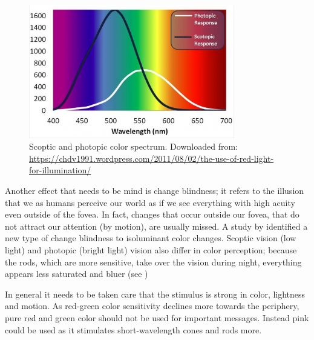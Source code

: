\begin{figure}
    \includegraphics[width=0.8\textwidth]{fig/scoptic.jpg}
    \caption[Color spectrum]{Scoptic and photopic color spectrum. Downloaded from: \url{https://chdv1991.wordpress.com/2011/08/02/the-use-of-red-light-for-illumination/}}
    \label{fig:spectrum}
\end{figure}
Another effect that needs to be mind is change blindness; it refers to the illusion that we as humans perceive our world as if we see everything with high acuity even outside of the fovea. In fact, changes that occur outside our fovea, that do not attract our attention (by motion), are usually missed. A study by \citet{Goddard2013AScale} identified a new type of change blindness to isoluminant color changes. Scoptic vision (low light) and photopic (bright light) vision also differ in color perception; because the rods, which are more sensitive, take over the vision during night, everything appears less saturated and bluer (see \emph{}) 

In general it needs to be taken care that the stimulus is strong in color, lightness and motion. As red-green color sensitivity declines more towards the periphery, pure red and green color should not be used for important messages. Instead pink could be used as it stimulates short-wavelength cones and rods more.

